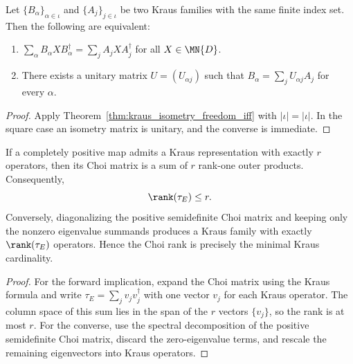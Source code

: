 \begin{theorem}
    \label{thm:kraus_unitary_freedom_iff}
    \leanok
    Let $\{B_\alpha\}_{\alpha \in \iota}$ and $\{A_j\}_{j \in \iota}$
    be two Kraus families with the same finite index set.
    Then the following are equivalent:
    \begin{enumerate}
        \item $\sum_\alpha B_\alpha X B_\alpha^\dagger
                  = \sum_j A_j X A_j^\dagger$ for all $X \in \MN{D}$.
        \item There exists a unitary matrix $U = (U_{\alpha j})$ such that
              $B_\alpha = \sum_j U_{\alpha j} A_j$ for every $\alpha$.
    \end{enumerate}
\end{theorem}

\begin{proof}
    \leanok
    Apply Theorem~\ref{thm:kraus_isometry_freedom_iff} with
    $|\iota| = |\iota|$.
    In the square case an isometry matrix is unitary, and the converse is
    immediate.
\end{proof}

\begin{remark}
    \label{rem:choi_rank_eq_min_kraus_cardinality}
    \leanok
    If a completely positive map admits a Kraus representation with exactly $r$
    operators, then its Choi matrix is a sum of $r$ rank-one outer products.
    Consequently,
    \[
        \rank(\tau_E) \le r.
    \]
    Conversely, diagonalizing the positive semidefinite Choi matrix and keeping
    only the nonzero eigenvalue summands produces a Kraus family with exactly
    $\rank(\tau_E)$ operators. Hence the Choi rank is precisely
    the minimal Kraus cardinality.
\end{remark}

\begin{proof}
    \leanok
    For the forward implication, expand the Choi matrix using the Kraus formula
    and write $\tau_E = \sum_j v_j v_j^\dagger$ with one vector $v_j$ for each
    Kraus operator. The column space of this sum lies in the span of the $r$
    vectors $\{v_j\}$, so the rank is at most $r$. For the converse, use the
    spectral decomposition of the positive semidefinite Choi matrix,
    discard the zero-eigenvalue terms, and rescale the remaining eigenvectors
    into Kraus operators.
\end{proof}

